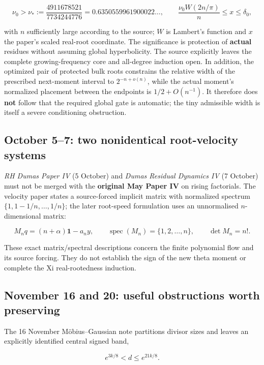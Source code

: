 \documentclass[
  10pt,
  a4paper,
  10pt,
  oneside,
  openany]{book}
\begin{document}
\[
 \nu_0>\nu_*:=\frac{4911678521}{7734244776}
 =0.6350559961900022\ldots,
 \qquad \frac{\nu_0 W(2n/\pi)}n\le x\le\delta_0,
 \tag{A34}\label{eq:A34}
\]

with \(n\) sufficiently large according to the source; \(W\) is
Lambert's function and \(x\) the paper's scaled real-root coordinate.
The significance is protection of \textbf{actual} residues without
assuming global hyperbolicity. The source explicitly leaves the complete
growing-frequency core and all-degree induction open. In addition, the
optimized pair of protected bulk roots constrains the relative width of
the prescribed next-moment interval to \(2^{-n+o(n)}\), while the actual
moment's normalized placement between the endpoints is
\(1/2+O(n^{-1})\). It therefore does \textbf{not} follow that the
required global gate is automatic; the tiny admissible width is itself a
severe conditioning obstruction.

\subsection{October 5--7: two nonidentical root-velocity
systems}\label{october-57-two-nonidentical-root-velocity-systems}

\emph{RH Dumas Paper IV} (5 October) and \emph{Dumas Residual Dynamics
IV} (7 October) must not be merged with the \textbf{original May Paper
IV} on rising factorials. The velocity paper states a source-forced
implicit matrix with normalized spectrum \(\{1,1-1/n,\ldots,1/n\}\); the
later root-speed formulation uses an unnormalised \(n\)-dimensional
matrix:

\[
 M_nq=(n+\alpha)\mathbf1-a_ny,
 \qquad \operatorname{spec}(M_n)=\{1,2,\ldots,n\},
 \qquad \det M_n=n!.
 \tag{A35}\label{eq:A35}
\]

These exact matrix/spectral descriptions concern the finite polynomial
flow and its source forcing. They do not establish the sign of the new
theta moment or complete the Xi real-rootedness induction.

\subsection{November 16 and 20: useful obstructions worth
preserving}\label{november-16-and-20-useful-obstructions-worth-preserving}

The 16 November Möbius--Gaussian note partitions divisor sizes and
leaves an explicitly identified central signed band,

\[
 e^{3k/8}<d\le e^{21k/8}.
 \tag{A36}\label{eq:A36}
\]
\end{document}
